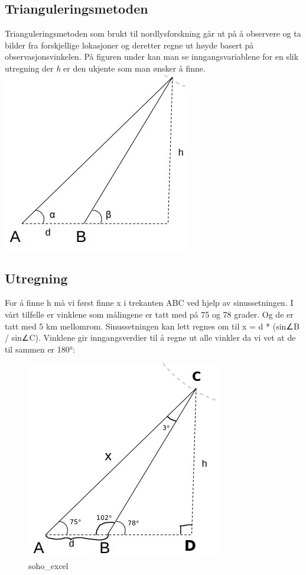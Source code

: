 \documentclass[11pt]{article}
\makeatletter
\def\maxwidth{\ifdim\Gin@nat@width>\linewidth\linewidth
    \else\Gin@nat@width\fi}
\let\Oldincludegraphics\includegraphics
\renewcommand{\includegraphics}[1]{\Oldincludegraphics[width=.8\maxwidth]{#1}}
\makeatother
\begin{document}
    \subsection{Trianguleringsmetoden}\label{trianguleringsmetoden}

    Trianguleringsmetoden som brukt til nordlysforskning går ut på å
observere og ta bilder fra forskjellige lokasjoner og deretter regne ut
høyde basert på observasjonsvinkelen. På figuren under kan man se
inngangsvariablene for en slik utregning der \emph{h} er den ukjente som
man ønsker å finne. \includegraphics{img/space_tech/tri.png}

    \subsection{Utregning}\label{utregning}

    For å finne h må vi først finne x i trekanten ABC ved hjelp av
sinussetningen. I vårt tilfelle er vinklene som målingene er tatt med på
75 og 78 grader. Og de er tatt med 5 km mellomrom. Sinussetningen kan
lett regnes om til x = d * (sin∠B / sin∠C). Vinklene gir inngangsverdier
til å regne ut alle vinkler da vi vet at de til sammen er 180°:

    \begin{figure}[htbp]
\centering
\includegraphics{img/space_tech/tri_math.png}
\caption{soho\_excel}
\end{figure}
\end{document}
